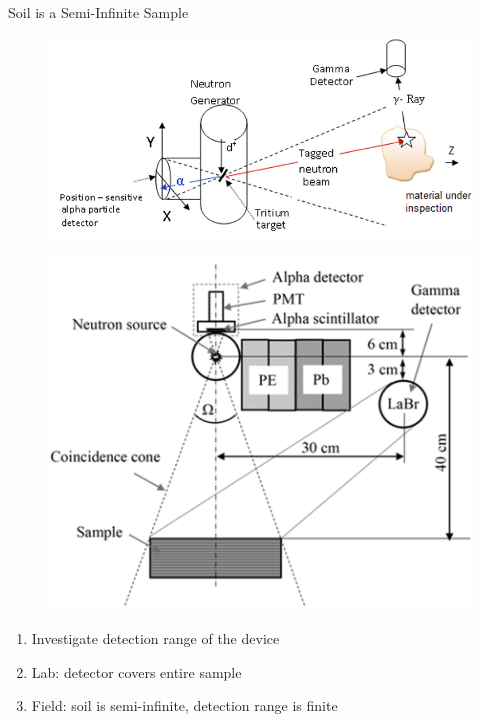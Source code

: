 \documentclass[10pt,hyperref={colorlinks,citecolor=blue,urlcolor=peking_blue,linkcolor=}]{beamer}
\theoremstyle{plain}
\begin{document}
\begin{frame}{Soil is a Semi-Infinite Sample}
\begin{figure}[Lab Spectroscopy]
\begin{center}
\includegraphics[width=1\linewidth]{../Figures/Misc/LabSpectros.png}
\end{center}
\end{figure}
\begin{figure}[Field Spectroscopy]
\begin{center}
\includegraphics[width=1\linewidth]{../Figures/Misc/FieldSpectros.png}
\end{center}
\end{figure}
\begin{enumerate}
\item Investigate detection range of the device
\item Lab: detector covers entire sample
\item Field: soil is semi-infinite, detection range is finite
\end{enumerate}
\end{frame}
\end{document}
